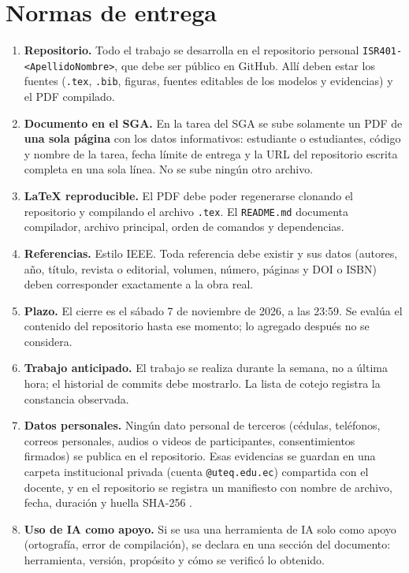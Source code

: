 \documentclass[11pt]{article}
\newcommand{\seccion}[1]{\section{\textcolor{utegreendk}{#1}}}
\begin{document}
\seccion{Normas de entrega}

\begin{enumerate}[leftmargin=20pt,itemsep=3pt]
	\item \textbf{Repositorio.} Todo el trabajo se desarrolla en el repositorio personal \texttt{ISR401-<ApellidoNombre>}, que debe ser público en GitHub. Allí deben estar los fuentes (\texttt{.tex}, \texttt{.bib}, figuras, fuentes editables de los modelos y evidencias) y el PDF compilado.
	\item \textbf{Documento en el SGA.} En la tarea del SGA se sube solamente un PDF de \textbf{una sola página} con los datos informativos: estudiante o estudiantes, código y nombre de la tarea, fecha límite de entrega y la URL del repositorio escrita completa en una sola línea. No se sube ningún otro archivo.
	\item \textbf{\LaTeX{} reproducible.} El PDF debe poder regenerarse clonando el repositorio y compilando el archivo \texttt{.tex}. El \texttt{README.md} documenta compilador, archivo principal, orden de comandos y dependencias.
	\item \textbf{Referencias.} Estilo IEEE. Toda referencia debe existir y sus datos (autores, año, título, revista o editorial, volumen, número, páginas y DOI o ISBN) deben corresponder exactamente a la obra real.
	\item \textbf{Plazo.} El cierre es el sábado 7 de noviembre de 2026, a las 23:59. Se evalúa el contenido del repositorio hasta ese momento; lo agregado después no se considera.
	\item \textbf{Trabajo anticipado.} El trabajo se realiza durante la semana, no a última hora; el historial de commits debe mostrarlo. La lista de cotejo registra la constancia observada.
	\item \textbf{Datos personales.} Ningún dato personal de terceros (cédulas, teléfonos, correos personales, audios o videos de participantes, consentimientos firmados) se publica en el repositorio. Esas evidencias se guardan en una carpeta institucional privada (cuenta \texttt{@uteq.edu.ec}) compartida con el docente, y en el repositorio se registra un manifiesto con nombre de archivo, fecha, duración y huella SHA-256 \citep{lopdp_2021}.
	\item \textbf{Uso de IA como apoyo.} Si se usa una herramienta de IA solo como apoyo (ortografía, error de compilación), se declara en una sección del documento: herramienta, versión, propósito y cómo se verificó lo obtenido.
\end{enumerate}
\end{document}
